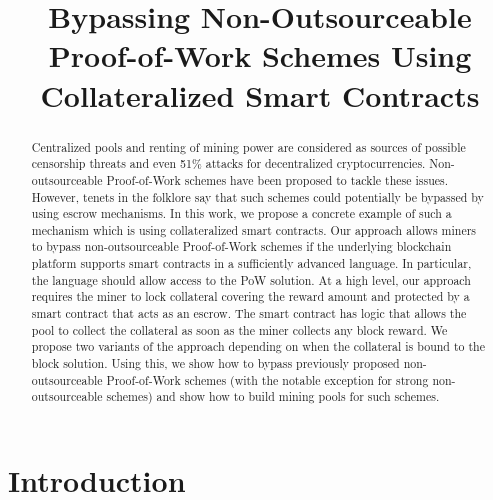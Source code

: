 \documentclass[runningheads]{llncs}
\newcommand{\poolname}{ErgoPool\xspace}
\begin{document}
\title{Bypassing Non-Outsourceable Proof-of-Work Schemes Using Collateralized Smart Contracts}
\maketitle

\begin{abstract}
    Centralized pools and renting of mining power are considered as sources of possible censorship threats and even 51\%
    attacks for decentralized cryptocurrencies. Non-outsourceable Proof-of-Work schemes have been proposed to tackle these issues. However, tenets in the folklore say that such schemes could potentially be bypassed by using escrow mechanisms.
    In this work, we propose a concrete example of such a mechanism which is using collateralized smart contracts. Our approach allows miners to bypass non-outsourceable Proof-of-Work schemes
    if the underlying blockchain platform supports smart contracts in a sufficiently advanced language. In particular, the language
    should allow access to the PoW solution.
    At a high level, our approach requires the miner to lock collateral covering the reward amount and protected by a smart contract that acts as an escrow. The smart contract has logic that allows the pool to collect the collateral as soon as the miner collects any block reward. We propose two variants of the approach depending on when the collateral is bound to the block solution. Using this, we show how to bypass previously proposed non-outsourceable Proof-of-Work schemes (with the notable exception for strong non-outsourceable schemes) and show how to build mining pools for such schemes.

\end{abstract}

\section{Introduction}
\end{document}
